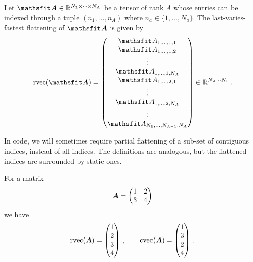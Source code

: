 \begin{definition}\label{def:rvec}
  Let $\tA \in \sR^{N_1 \times \dots \times N_A}$ be a tensor of rank $A$ whose entries can be indexed through a tuple $(n_1, \dots, n_A)$ where $n_a \in \{1, \dots, N_a\}$.
  The last-varies-fastest flattening of $\tA$ is given by
  \begin{align*}
    \rvec(\tA) =
    \begin{pmatrix}
      \etA_{1,\dots,1,1} \\
      \etA_{1,\dots,1,2} \\
      \vdots \\
      \etA_{1,\dots,1,N_A} \\
      \etA_{1,\dots,2,1} \\
      \vdots \\
      \etA_{1,\dots,2,N_A} \\
      \vdots \\
      \etA_{N_1,\dots,N_{A-1},N_A}
    \end{pmatrix}
    \in \sR ^{N_A \cdots N_1}\,.
  \end{align*}
\end{definition}

In code, we will sometimes require partial flattening of a sub-set of contiguous indices, instead of all indices.
The definitions are analogous, but the flattened indices are surrounded by static ones.

\begin{example}\label{ex:flattening}
  For a matrix
  \begin{equation*}
    {\bm{A}} = \begin{pmatrix} 1 & 2 \\ 3 & 4 \end{pmatrix}
  \end{equation*}
  we have
  \begin{equation*}
    \operatorname{rvec}({\bm{A}})
    =
    \begin{pmatrix}
      1 \\ 2 \\ 3 \\ 4
    \end{pmatrix}\,,
    \qquad
    \operatorname{cvec}({\bm{A}})
    =
    \begin{pmatrix}
      1 \\ 3 \\ 2 \\ 4
    \end{pmatrix}\,.
  \end{equation*}
\end{example}
